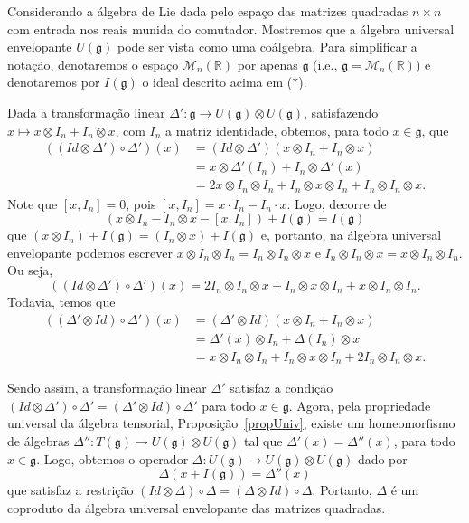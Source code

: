 \documentclass[twoside,openright,titlepage,numbers=noenddot,headinclude,  lineheaders footinclude=true,cleardoublepage=empty,
                                BCOR=5mm,paper=a4,fontsize=12pt ]{scrbook}
\theoremstyle{definition}
\begin{document}
Considerando a álgebra de Lie dada pelo espaço das matrizes quadradas $n \times n$ com entrada nos reais munida
do comutador. 
Mostremos que
a álgebra universal envelopante $U(\mathfrak{g})$ pode ser vista como uma coálgebra.
Para simplificar a notação, denotaremos o espaço $\mathcal{M}_n(\mathbb{R})$
por apenas $\mathfrak{g}$ (i.e., $\mathfrak{g} = \mathcal{M}_n(\mathbb{R})$) e denotaremos por
$I(\mathfrak{g})$ o ideal descrito acima em ($\ast$).

Dada a transformação linear $\Delta': \mathfrak{g} \rightarrow U(\mathfrak{g} ) \otimes
 U(\mathfrak{g} )$, 
satisfazendo $x \mapsto x \otimes I_n + I_n \otimes x$,  com $I_n$ a matriz identidade, obtemos, para
todo $x \in \mathfrak{g} $, que
\begin{align*}
((Id \otimes \Delta')\circ \Delta')(x) &= (Id \otimes \Delta') (x \otimes I_n + I_n \otimes x)\\
								  &= x \otimes \Delta'(I_n) + I_n \otimes \Delta'(x)\\ 
								  &= 2 x \otimes I_n \otimes I_n + I_n \otimes x \otimes I_n + I_n \otimes I_n \otimes x.
\end{align*}
Note que $[x, I_n] = 0$, pois $[x, I_n] = x \cdot I_n - I_n \cdot x$. Logo, decorre de
\[ (x \otimes I_n - I_n \otimes x - [x, I_n]) + I( \mathfrak{g} ) = I( \mathfrak{g} ) \]
que $(x \otimes I_n ) + I( \mathfrak{g} ) = (I_n \otimes x ) + I( \mathfrak{g} )$ e,
portanto, na álgebra universal envelopante podemos escrever $x \otimes I_n \otimes I_n = I_n \otimes I_n \otimes x$ e
$ I_n \otimes I_n \otimes x = x \otimes I_n \otimes I_n$. Ou seja,
\[((Id \otimes \Delta') \circ \Delta')(x)=  2 I_n \otimes I_n \otimes x + I_n \otimes x \otimes I_n + x \otimes I_n \otimes I_n.\]
Todavia, temos que
\begin{align*}
(( \Delta' \otimes Id) \circ \Delta')(x) &= (\Delta' \otimes Id) (x \otimes I_n + I_n \otimes x)\\
								  &= \Delta'(x) \otimes I_n + \Delta(I_n) \otimes x\\
								  &=  x \otimes I_n \otimes I_n + I_n \otimes x \otimes I_n +  2 I_n \otimes I_n \otimes x.
\end{align*}

Sendo assim, a transformação linear $\Delta'$ satisfaz a condição $(Id \otimes \Delta') \circ \Delta' =
(\Delta' \otimes Id) \circ \Delta' $ para todo $x \in \mathfrak{g}$.
Agora, pela propriedade universal da álgebra tensorial, Proposição~\ref{propUniv}, existe um homeomorfismo
de álgebras $\Delta'': T( \mathfrak{g} ) \rightarrow U( \mathfrak{g} ) \otimes
 U( \mathfrak{g} ) $ tal que
$ \Delta'(x) = \Delta''(x)$, para todo $ x \in \mathfrak{g} $. Logo, obtemos o operador
$\Delta: U( \mathfrak{g} ) \rightarrow U( \mathfrak{g} ) \otimes
 U( \mathfrak{g} )$ dado por
\[ \Delta( x + I( \mathfrak{g} ) ) = \Delta''(x) \]
que satisfaz a restrição $(Id \otimes \Delta) \circ \Delta =(\Delta \otimes Id) \circ \Delta $.
Portanto, $\Delta$ é um coproduto da álgebra universal envelopante das matrizes quadradas.
\end{document}
